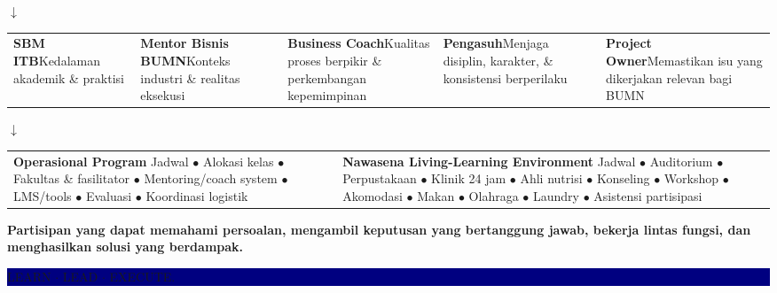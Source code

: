 \documentclass[10pt]{article}
\begin{document}
\begin{center}\color{navy}\Large$\downarrow$\end{center}

\begin{tcolorbox}[colback=paleyellow,colframe=gold,
  title={\Large 4 \quad Sistem Mentoring\quad\small\itshape Arsitektur pendukung berlapis},fonttitle=\bfseries]
\begin{tabularx}{\linewidth}{Y Y Y Y Y}
\textbf{SBM ITB}\newline Kedalaman akademik \& praktisi &
\textbf{Mentor Bisnis BUMN}\newline Konteks industri \& realitas eksekusi &
\textbf{Business Coach}\newline Kualitas proses berpikir \& perkembangan kepemimpinan &
\textbf{Pengasuh}\newline Menjaga disiplin, karakter, \& konsistensi berperilaku &
\textbf{Project Owner}\newline Memastikan isu yang dikerjakan relevan bagi BUMN
\end{tabularx}
\end{tcolorbox}

\begin{center}\color{navy}\Large$\downarrow$\end{center}

\begin{tcolorbox}[colback=lightgreen,colframe=green,
  title={\Large 5 \quad Operasional \& Fasilitas\quad\small\itshape Infrastruktur pembelajaran terpercaya},fonttitle=\bfseries]
\begin{tabularx}{\linewidth}{Y Y}
\textbf{Operasional Program}\newline
Jadwal $\bullet$ Alokasi kelas $\bullet$ Fakultas \& fasilitator $\bullet$ Mentoring/coach system $\bullet$ LMS/tools $\bullet$ Evaluasi $\bullet$ Koordinasi logistik
&
\textbf{Nawasena Living-Learning Environment}\newline
Jadwal $\bullet$ Auditorium $\bullet$ Perpustakaan $\bullet$ Klinik 24 jam $\bullet$ Ahli nutrisi $\bullet$ Konseling $\bullet$ Workshop $\bullet$ Akomodasi $\bullet$ Makan $\bullet$ Olahraga $\bullet$ Laundry $\bullet$ Asistensi partisipasi
\end{tabularx}
\end{tcolorbox}

\begin{tcolorbox}[colback=paleblue,colframe=navy,title=Target Outcome,fonttitle=\Large\bfseries]
\textbf{Partisipan yang dapat memahami persoalan, mengambil keputusan yang bertanggung jawab, bekerja lintas fungsi, dan menghasilkan solusi yang berdampak.}
\hfill\colorbox{navy}{\color{white}\bfseries\strut LEARN $\boldsymbol\cdot$ LEAD $\boldsymbol\cdot$ EXECUTE.}
\end{tcolorbox}
\end{document}
